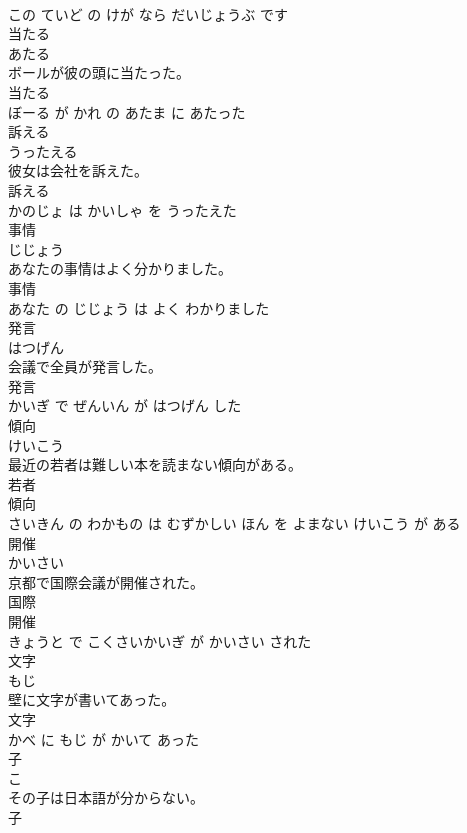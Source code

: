 \documentclass[8pt]{extreport}
\begin{document}
\begin{CJK}{UTF8}{min}
\\	この ていど の けが なら だいじょうぶ です			
\\	当たる	
\\	あたる			
\\	ボールが彼の頭に当たった。	
\\	当たる 
\\	ぼーる が かれ の あたま に あたった			
\\	訴える	
\\	うったえる			
\\	彼女は会社を訴えた。	
\\	訴える 
\\	かのじょ は かいしゃ を うったえた			
\\	事情	
\\	じじょう			
\\	あなたの事情はよく分かりました。	
\\	事情 
\\	あなた の じじょう は よく わかりました			
\\	発言	
\\	はつげん			
\\	会議で全員が発言した。	
\\	発言 
\\	かいぎ で ぜんいん が はつげん した			
\\	傾向	
\\	けいこう			
\\	最近の若者は難しい本を読まない傾向がある。	
\\	若者 
\\	傾向 
\\	さいきん の わかもの は むずかしい ほん を よまない けいこう が ある			
\\	開催	
\\	かいさい			
\\	京都で国際会議が開催された。	
\\	国際 
\\	開催 
\\	きょうと で こくさいかいぎ が かいさい された			
\\	文字	
\\	もじ			
\\	壁に文字が書いてあった。	
\\	文字 
\\	かべ に もじ が かいて あった			
\\	子	
\\	こ			
\\	その子は日本語が分からない。	
\\	子 

\end{CJK}
\end{document}
